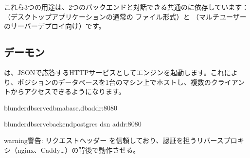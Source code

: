 \documentclass[letterpaper,10pt,dvipdfmx]{sphinxmanual}
\begin{document}
\sphinxAtStartPar
これら3つの用途は、2つのバックエンドと対話できる共通のに依存しています：（デスクトップアプリケーションの通常の  ファイル形式）と （マルチユーザーのサーバーデプロイ向け）です。


\subsection{デーモン }
\label{\detokenize{mode_headless:le-demon-serve}}\label{\detokenize{mode_headless:headless-serve}}
\sphinxAtStartPar
{} は、JSONで応答するHTTPサービスとしてエンジンを起動します。これにより、ポジションのデータベースを1台のマシン上でホストし、複数のクライアントからアクセスできるようになります。

\begin{sphinxVerbatim}[commandchars=\\\{\}]
blunderdbserve\PYGZhy{}\PYGZhy{}dbma\PYGZus{}base.db\PYGZhy{}\PYGZhy{}addr:8080

blunderdbserve\PYGZhy{}\PYGZhy{}backendpostgres
\PYGZhy{}\PYGZhy{}dsn
\PYGZhy{}\PYGZhy{}addr:8080
\end{sphinxVerbatim}

\begin{sphinxadmonition}{warning}{警告:}
\sphinxAtStartPar
{} リクエストヘッダー  を信頼しており、認証を担うリバースプロキシ（nginx、Caddy…）の背後で動作させる。
\end{sphinxadmonition}

\sphinxAtStartPar
{}
\end{document}
